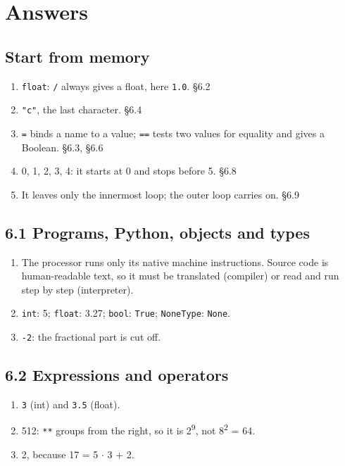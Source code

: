 \documentclass[11pt]{article}
\begin{document}
\clearpage
\section{Answers}
\begin{keepsection}\subsection{Start from memory}

\begin{enumerate}
\item \texttt{float}: \texttt{/} always gives a float, here \texttt{1.0}. \hfill{\small\color{FAUblue}§6.2}
\item \texttt{"c"}, the last character. \hfill{\small\color{FAUblue}§6.4}
\item \texttt{=} binds a name to a value; \texttt{==} tests two values for equality and gives a Boolean. \hfill{\small\color{FAUblue}§6.3, §6.6}
\item 0, 1, 2, 3, 4: it starts at 0 and stops before 5. \hfill{\small\color{FAUblue}§6.8}
\item It leaves only the innermost loop; the outer loop carries on. \hfill{\small\color{FAUblue}§6.9}
\end{enumerate}

\end{keepsection}
\begin{keepsection}\subsection{6.1 Programs, Python, objects and types}

\begin{enumerate}
\item The processor runs only its native machine instructions. Source code is human-readable text, so it must be translated (compiler) or read and run step by step (interpreter).
\item \texttt{int}: 5; \texttt{float}: 3.27; \texttt{bool}: \texttt{True}; \texttt{NoneType}: \texttt{None}.
\item \texttt{-2}: the fractional part is cut off.
\end{enumerate}

\end{keepsection}
\begin{keepsection}\subsection{6.2 Expressions and operators}

\begin{enumerate}
\item \texttt{3} (int) and \texttt{3.5} (float).
\item 512: \texttt{**} groups from the right, so it is 2\textsuperscript{9}, not 8\textsuperscript{2} = 64.
\item 2, because 17 = 5 \ensuremath{\cdot} 3 + 2.
\end{enumerate}

\end{keepsection}
\end{document}
